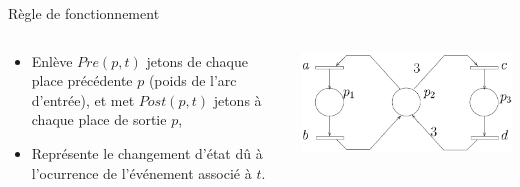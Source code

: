 \documentclass[compress]{beamer}
\begin{document}
\begin{frame}{Règle de fonctionnement}
\begin{columns}
	\begin{column}{.6\linewidth}
		\begin{itemize}
		\item  Enlève $Pre(p,t)$ jetons de chaque place précédente $p$ (poids de l'arc d'entrée), et met $Post(p,t)$ jetons à chaque place de sortie $p$,
		\item  Représente le changement d'état dû à l'ocurrence de l'événement associé à $t$.
		\end{itemize}
	\end{column}
	\begin{column}{.4\linewidth}
		\begin{center}
		\includegraphics[width=\linewidth]{le}
		\end{center}
	\end{column}
\end{columns}
\end{frame}
\end{document}
